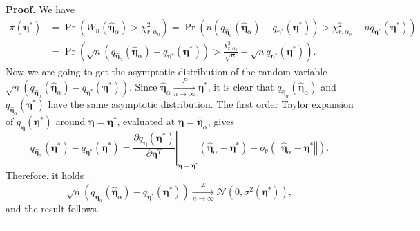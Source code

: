 \documentclass[a4paper]{article}%
\newenvironment{proof}[1][Proof]{\noindent \textbf{#1.} }{\  \rule{0.5em}{0.5em}}
\begin{document}
\begin{proof}
We have
\begin{align*}
\pi\left(  \boldsymbol{\eta}^{\ast}\right)   &  =\Pr\left(  W_{n}%
(\widehat{\boldsymbol{\eta}}_{\alpha})>\chi_{r,\alpha_0}^{2}\right)  =\Pr\left(
n\left(  q_{\widehat{\boldsymbol{\eta}}_{\alpha}}(\widehat{\boldsymbol{\eta}%
}_{\alpha})-q_{\boldsymbol{\eta}^{\ast}}(\boldsymbol{\eta}^{\ast})\right)
>\chi_{r,\alpha_0}^{2}-nq_{\boldsymbol{\eta}^{\ast}}(\boldsymbol{\eta}^{\ast
})\right) \\
&  =\Pr\left(  \sqrt{n}\left(  q_{\widehat{\boldsymbol{\eta}}_{\alpha}%
}(\widehat{\boldsymbol{\eta}}_{\alpha})-q_{\boldsymbol{\eta}^{\ast}%
}(\boldsymbol{\eta}^{\ast})\right)  >\frac{\chi_{r,\alpha_0}^{2}}{\sqrt{n}%
}-\sqrt{n}q_{\boldsymbol{\eta}^{\ast}}(\boldsymbol{\eta}^{\ast})\right)  .
\end{align*}
Now we are going to get the asymptotic distribution of the random variable
$\sqrt{n}\left(  q_{\widehat{\boldsymbol{\eta}}_{\alpha}}%
(\widehat{\boldsymbol{\eta}}_{\alpha})-q_{\boldsymbol{\eta}^{\ast}%
}(\boldsymbol{\eta}^{\ast})\right)  $. Since $\widehat{\boldsymbol{\eta}%
}_{\alpha}\underset{n\rightarrow\infty}{\overset{P}{\longrightarrow}%
}\boldsymbol{\eta}^{\ast}$, it is clear that $q_{\widehat{\boldsymbol{\eta}%
}_{\alpha}}(\widehat{\boldsymbol{\eta}}_{\alpha})$ and
$q_{\widehat{\boldsymbol{\eta}}_{\alpha}}(\boldsymbol{\eta}^{\ast})$ have the
same asymptotic distribution. The first order Taylor expansion of
$q_{{\boldsymbol{\eta}}}(\boldsymbol{\eta}^{\ast})$ around $\boldsymbol{\eta}=\boldsymbol{\eta}^{\ast}$,
evaluated at $\boldsymbol{\eta}=\widehat{\boldsymbol{\eta}}_{\alpha}$,  
gives%
\[
q_{\widehat{\boldsymbol{\eta}}_{\alpha}}(\boldsymbol{\eta}^{\ast
})-q_{\boldsymbol{\eta}^{\ast}}(\boldsymbol{\eta}^{\ast})=\left.
\frac{\partial q_{\boldsymbol{\eta}}(\boldsymbol{\eta}^{\ast})}{\partial
\boldsymbol{\eta}^{T}}\right\vert _{\boldsymbol{\eta}=\boldsymbol{\eta}^{\ast
}}(\widehat{\boldsymbol{\eta}}_{\alpha}-\boldsymbol{\eta}^{\ast})+o_{p}\left(
\left\Vert \widehat{\boldsymbol{\eta}}_{\alpha}-\boldsymbol{\eta}^{\ast
}\right\Vert \right)  .
\]
Therefore, it holds%
\[
\sqrt{n}\left(  q_{\widehat{\boldsymbol{\eta}}_{\alpha}}%
(\widehat{\boldsymbol{\eta}}_{\alpha})-q_{\boldsymbol{\eta}^{\ast}%
}(\boldsymbol{\eta}^{\ast})\right)  \underset{n\rightarrow\infty
}{\overset{\mathcal{L}}{\longrightarrow}}\mathcal{N}\left(  0,\sigma
^{2}\left(  \boldsymbol{\eta}^{\ast}\right)  \right)  ,
\]
and the result follows.
\end{proof}
\end{document}

